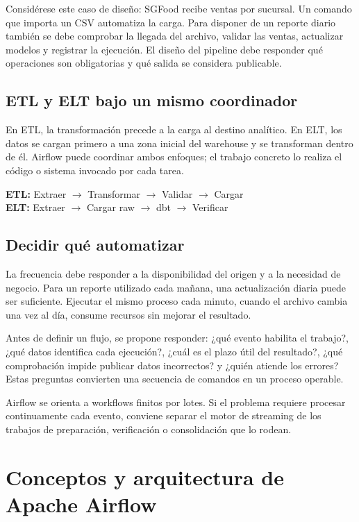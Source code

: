 \documentclass[12pt]{article}
\begin{document}
Considérese este caso de diseño: SGFood recibe ventas por sucursal. Un comando que importa un CSV automatiza la carga. Para disponer de un reporte diario también se debe comprobar la llegada del archivo, validar las ventas, actualizar modelos y registrar la ejecución. El diseño del pipeline debe responder qué operaciones son obligatorias y qué salida se considera publicable.

\subsection{ETL y ELT bajo un mismo coordinador}
En ETL, la transformación precede a la carga al destino analítico. En ELT, los datos se cargan primero a una zona inicial del warehouse y se transforman dentro de él. Airflow puede coordinar ambos enfoques; el trabajo concreto lo realiza el código o sistema invocado por cada tarea.

\begin{center}
\textbf{ETL:} Extraer $\rightarrow$ Transformar $\rightarrow$ Validar $\rightarrow$ Cargar\\[6pt]
\textbf{ELT:} Extraer $\rightarrow$ Cargar raw $\rightarrow$ dbt $\rightarrow$ Verificar
\end{center}

\subsection{Decidir qué automatizar}
La frecuencia debe responder a la disponibilidad del origen y a la necesidad de negocio. Para un reporte utilizado cada mañana, una actualización diaria puede ser suficiente. Ejecutar el mismo proceso cada minuto, cuando el archivo cambia una vez al día, consume recursos sin mejorar el resultado.

Antes de definir un flujo, se propone responder: ¿qué evento habilita el trabajo?, ¿qué datos identifica cada ejecución?, ¿cuál es el plazo útil del resultado?, ¿qué comprobación impide publicar datos incorrectos? y ¿quién atiende los errores? Estas preguntas convierten una secuencia de comandos en un proceso operable.

Airflow se orienta a workflows finitos por lotes. Si el problema requiere procesar continuamente cada evento, conviene separar el motor de streaming de los trabajos de preparación, verificación o consolidación que lo rodean.

\section{Conceptos y arquitectura de Apache Airflow}
\end{document}
